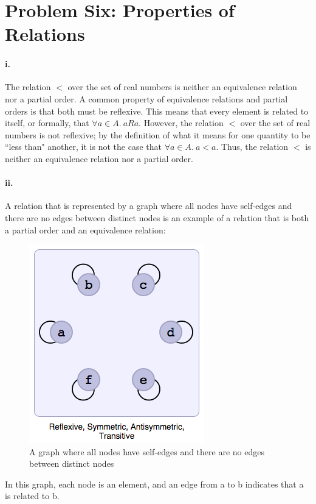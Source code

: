 \documentclass[10pt,letter]{article}
\begin{document}
\pagebreak
\section*{Problem Six: Properties of Relations}

\paragraph{i.} The relation $<$ over the set of real numbers is neither an equivalence relation nor a partial order. A common property of equivalence relations and partial orders is that both must be reflexive. This means that every element is related to itself, or formally, that $\forall a \in A.\ aRa$. However, the relation $<$ over the set of real numbers is not reflexive; by the definition of what it means for one quantity to be ``less than" another, it is not the case that $\forall a \in A.\ a<a$. Thus, the relation $<$ is neither an equivalence relation nor a partial order. 

\paragraph{ii.} A relation that is represented by a graph where all nodes have self-edges and there are no edges between distinct nodes is an example of a relation that is both a partial order and an equivalence relation:

\begin{figure}[h]
\centering
  \includegraphics[width=0.45\linewidth]{hw4_6ii.png}
  \caption{A graph where all nodes have self-edges and there are no edges between distinct nodes}
  \label{fig:q6ii}
\end{figure}

In this graph, each node is an element, and an edge from a to b indicates that a is related to b. 
\end{document}
